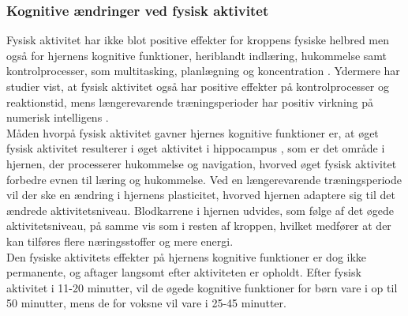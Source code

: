 \subsubsection{Kognitive ændringer ved fysisk aktivitet}
Fysisk aktivitet har ikke blot positive effekter for kroppens fysiske helbred men også for hjernens kognitive funktioner, heriblandt indlæring, hukommelse samt kontrolprocesser, som multitasking, planlægning og koncentration \citep{Berchtold2010,Schmidt2015}. Ydermere har studier vist, at fysisk aktivitet også har positive effekter på kontrolprocesser og reaktionstid, mens længerevarende træningsperioder har positiv virkning på numerisk intelligens \citep{Bugge2015,Berchtold2010,Schmidt2015}.\\
Måden hvorpå fysisk aktivitet gavner hjernes kognitive funktioner er, at øget fysisk aktivitet resulterer i øget aktivitet i hippocampus , som er det område i hjernen, der processerer hukommelse og navigation, hvorved øget fysisk aktivitet forbedre evnen til læring og hukommelse. Ved en længerevarende træningsperiode vil der ske en ændring i hjernens plasticitet, hvorved hjernen adaptere sig til det ændrede aktivitetsniveau. Blodkarrene i hjernen udvides, som følge af det øgede aktivitetsniveau, på samme vis som i resten af kroppen, hvilket medfører at der kan tilføres flere næringsstoffer og mere energi. \citep{Cotman2007}\\
Den fysiske aktivitets effekter på hjernens kognitive funktioner er dog ikke permanente, og aftager langsomt efter aktiviteten er opholdt. Efter fysisk aktivitet i 11-20 minutter, vil de øgede kognitive funktioner for børn vare i op til 50 minutter, mens de for voksne vil vare i 25-45 minutter. \citep{Cotman2007}



